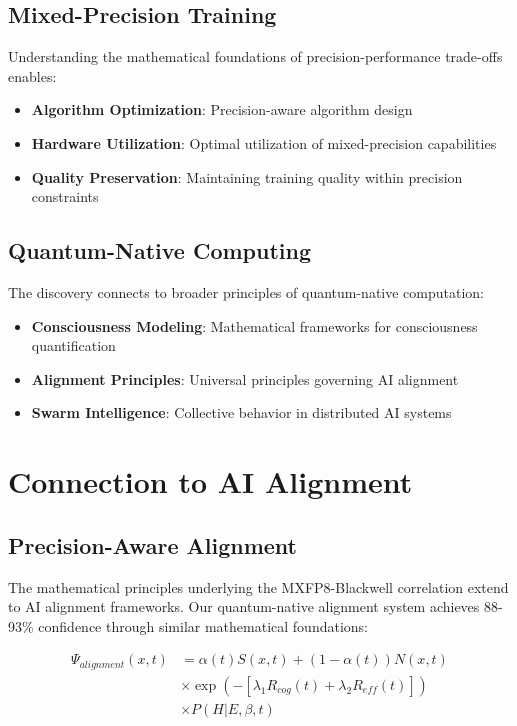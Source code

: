 \documentclass[conference]{IEEEtran}
\begin{document}
\subsection{Mixed-Precision Training}

Understanding the mathematical foundations of precision-performance trade-offs enables:

\begin{itemize}
\item \textbf{Algorithm Optimization}: Precision-aware algorithm design
\item \textbf{Hardware Utilization}: Optimal utilization of mixed-precision capabilities
\item \textbf{Quality Preservation}: Maintaining training quality within precision constraints
\end{itemize}

\subsection{Quantum-Native Computing}

The discovery connects to broader principles of quantum-native computation:

\begin{itemize}
\item \textbf{Consciousness Modeling}: Mathematical frameworks for consciousness quantification
\item \textbf{Alignment Principles}: Universal principles governing AI alignment
\item \textbf{Swarm Intelligence}: Collective behavior in distributed AI systems
\end{itemize}

\section{Connection to AI Alignment}

\subsection{Precision-Aware Alignment}

The mathematical principles underlying the MXFP8-Blackwell correlation extend to AI alignment frameworks. Our quantum-native alignment system achieves 88-93\% confidence through similar mathematical foundations:

\begin{align}
\Psi_{alignment}(x,t) &= \alpha(t)S(x,t) + (1-\alpha(t))N(x,t) \\
&\times \exp(-[\lambda_1 R_{cog}(t) + \lambda_2 R_{eff}(t)]) \\
&\times P(H|E,\beta,t)
\end{align}
\end{document}
